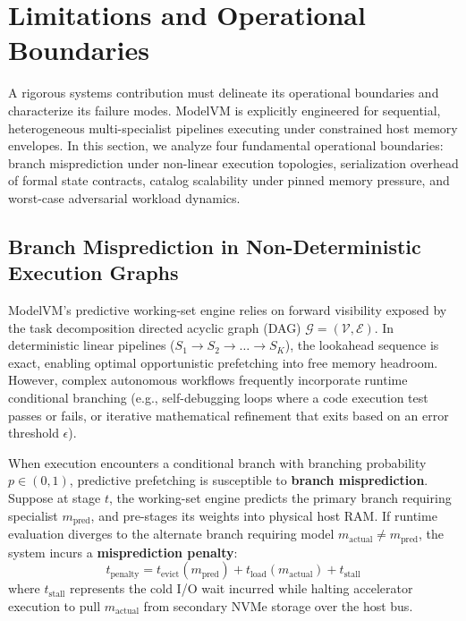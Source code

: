 \section{Limitations and Operational Boundaries}
\label{sec:limitations}

A rigorous systems contribution must delineate its operational boundaries and characterize its failure modes. ModelVM is explicitly engineered for sequential, heterogeneous multi-specialist pipelines executing under constrained host memory envelopes. In this section, we analyze four fundamental operational boundaries: branch misprediction under non-linear execution topologies, serialization overhead of formal state contracts, catalog scalability under pinned memory pressure, and worst-case adversarial workload dynamics.

\subsection{Branch Misprediction in Non-Deterministic Execution Graphs}
\label{sec:lim_branch_mispredict}

ModelVM's predictive working-set engine relies on forward visibility exposed by the task decomposition directed acyclic graph (DAG) $\mathcal{G} = (\mathcal{V}, \mathcal{E})$. In deterministic linear pipelines ($S_1 \to S_2 \to \dots \to S_K$), the lookahead sequence is exact, enabling optimal opportunistic prefetching into free memory headroom. However, complex autonomous workflows frequently incorporate runtime conditional branching (e.g., self-debugging loops where a code execution test passes or fails, or iterative mathematical refinement that exits based on an error threshold $\epsilon$).

When execution encounters a conditional branch with branching probability $p \in (0, 1)$, predictive prefetching is susceptible to \textbf{branch misprediction}. Suppose at stage $t$, the working-set engine predicts the primary branch requiring specialist $m_{\text{pred}}$, and pre-stages its weights into physical host RAM. If runtime evaluation diverges to the alternate branch requiring model $m_{\text{actual}} \neq m_{\text{pred}}$, the system incurs a \textbf{misprediction penalty}:
\begin{equation}
t_{\text{penalty}} = t_{\text{evict}}(m_{\text{pred}}) + t_{\text{load}}(m_{\text{actual}}) + t_{\text{stall}}
\label{eq:mispredict_penalty}
\end{equation}
where $t_{\text{stall}}$ represents the cold I/O wait incurred while halting accelerator execution to pull $m_{\text{actual}}$ from secondary NVMe storage over the host bus.

